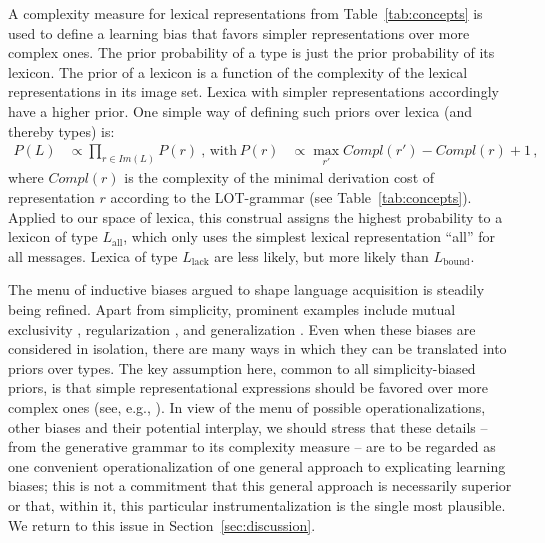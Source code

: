 \documentclass[a4paper, 11pt]{article}
\theoremstyle{Satz}
\newcommand{\mylang}[1]{\ensuremath{L_{\text{#1}}}\xspace} %
\newcommand{\Lall}{\mylang{all}}
\newcommand{\Lbound}{\mylang{bound}}
\newcommand{\Llack}{\mylang{lack}}
\begin{document}
A complexity measure for lexical representations from Table~\ref{tab:concepts} is used to define a
learning bias that favors simpler representations over more complex ones. The prior probability of a
type is just the prior probability of its lexicon. The prior of a lexicon is a function of the
complexity of the lexical representations in its image set. Lexica with simpler representations accordingly have a
higher prior. One simple way of defining such priors over lexica (and thereby types) is:
\begin{align*}
  P(L)  & \propto \prod_{r \in Im(L)} P(r)   \ \text{, with} & 
  P(r) & \propto \max_{r'}Compl(r') - Compl(r) + 1\,,
\end{align*}
where $Compl(r)$ is the complexity of the minimal derivation cost of representation $r$ according to the
LOT-grammar (see Table~\ref{tab:concepts}). Applied to our space of lexica, this construal assigns the highest probability 
to a lexicon of type $\Lall$, which only uses the simplest lexical representation ``all'' for
all messages. Lexica of type $\Llack$ are less likely, but more likely than $\Lbound$. 

The menu of inductive biases argued to shape language acquisition is steadily being refined. Apart from simplicity, prominent examples include mutual exclusivity \citep{merriman+bowman:1989,clark:2009}, regularization \citep{hudson+etal:2005}, and generalization \citep{smith:2011}. Even when these biases are considered in isolation, there are many ways in which they can be translated into priors over types. The key assumption here, common to all simplicity-biased priors, is that simple representational expressions should be favored over more complex ones (see, e.g., \citealt{goodman+etal:2008, piantadosi+etal:2012a, kirby+etal:2015}). In view of the menu of possible operationalizations, other biases and their potential interplay, we should stress that these details -- from the generative grammar to its complexity measure -- are to be regarded as one convenient operationalization of one general approach to explicating learning biases; this is not a commitment that this general approach is necessarily superior or that, within it, this particular instrumentalization is the single most plausible. We return to this issue in Section~\ref{sec:discussion}.
\end{document}
